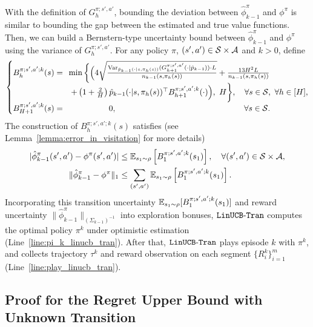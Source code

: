 With the definition of $G^{\pi;s',a'}_h$, bounding the deviation between $\hat{\phi}_{k-1}^{\pi}$ and $\phi^{\pi}$ is similar to bounding the gap between the estimated and true value functions. Then, we can build a Bernstern-type uncertainty bound between $\hat{\phi}_{k-1}^{\pi}$ and $\phi^{\pi}$ using the variance of $G^{\pi;s',a'}_h$.
For any policy $\pi$, $(s',a') \in \mathcal{S} \times \mathcal{A}$ and $k>0$, define
\begin{equation}
	\left\{\begin{matrix}
		B^{\pi;s',a';k}_h(s)=& \hspace*{-5em} \min\bigg\{ \Big( 4\sqrt{\frac{ \var_{\hat{p}_{k-1}(\cdot|s,\pi_h(s))}(G^{\pi;s',a'}_{h+1}(\cdot|\hat{p}_{k-1})) \cdot L}{{n_{k-1}(s,\pi_h(s))}}}  + \frac{13H^2L}{n_{k-1}(s,\pi_h(s))} 
		\\& + \sbr{1+\frac{2}{H}} \hat{p}_{k-1}(\cdot|s,\pi_h(s))^\top B^{\pi;s',a';k}_{h+1}(\cdot) \Big) ,\ H \bigg\} , \hspace*{1em} \forall s \in \cS , \ \forall h \in [H] ,
		\\
		B^{\pi;s',a';k}_{H+1}(s)=&0 , \hspace*{15.7em} \forall s \in \cS .
	\end{matrix}\right. \label{eq:def_tran_bonus}
\end{equation}
The construction of $B^{\pi;s',a';k}_h(s)$ satisfies (see Lemma~\ref{lemma:error_in_visitation} for more details) 
\begin{align*}
	|\hat{\phi}_{k-1}^{\pi}(s',a')-\phi^{\pi}(s',a')| &\leq \mathbb{E}_{s_1 \sim \rho}\left[ B^{\pi;s',a';k}_1(s_1) \right], \quad \forall (s',a') \in \mathcal{S} \times \mathcal{A} ,
	\\
	\|\hat{\phi}_{k-1}^{\pi} - \phi^{\pi}\|_1 &\leq \sum_{(s',a')} \mathbb{E}_{s_1 \sim \rho}\left[ B^{\pi;s',a';k}_1(s_1) \right] .
\end{align*} 
Incorporating this transition uncertainty $\mathbb{E}_{s_1 \sim \rho}[B^{\pi;s',a';k}_1(s_1)]$ and reward uncertainty $\|\hat{\phi}_{k-1}^{\pi}\|_{(\Sigma_{k-1})^{-1}}$ into exploration bonuses, $\mathtt{LinUCB\mbox{-}Tran}$ computes the optimal policy $\pi^k$ under optimistic estimation (Line~\ref{line:pi_k_linucb_tran}). After that, $\mathtt{LinUCB\mbox{-}Tran}$ plays episode $k$ with $\pi^k$, and collects trajectory $\tau^k$ and reward observation on each segment $\{R^k_i\}_{i=1}^{m}$ (Line~\ref{line:play_linucb_tran}).


\subsection{Proof for the Regret Upper Bound with Unknown Transition} \label{apx:ub_sum_unknown_tran}

